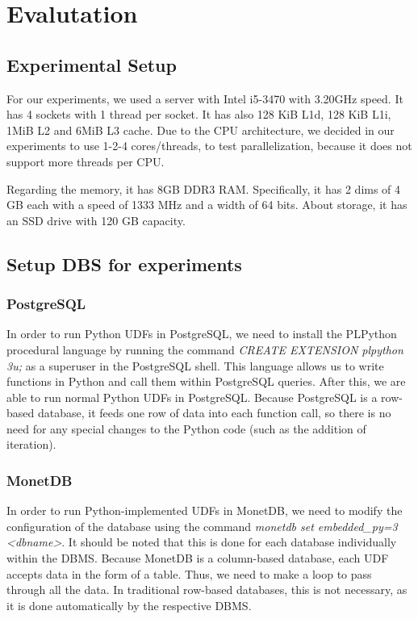 \section{Evalutation}
\label{sec:experiments}

\subsection{Experimental Setup}
\label{subsec:systemspecs}
For our experiments, we used a server with Intel i5-3470 with 3.20GHz speed. It has 4 sockets with 1 thread per socket. 
It has also 128 KiB L1d, 128 KiB L1i, 1MiB L2 and 6MiB L3 cache. Due to the CPU architecture, 
we decided in our experiments to use 1-2-4 cores/threads, 
to test parallelization, because it does not support more threads per CPU.

Regarding the memory, it has 8GB DDR3 RAM. Specifically, it has 2 dims of 4 GB each with a speed of 1333 MHz and a width of 64 bits. 
About storage, it has an SSD drive with 120 GB capacity.

\subsection{Setup DBS for experiments}
\subsubsection{PostgreSQL}
In order to run Python UDFs in PostgreSQL, we need to install the PL\/Python 
procedural language by running the command \emph{CREATE EXTENSION plpython
3u;} as a superuser in the PostgreSQL shell. 
This language allows us to write functions in Python and call them within
PostgreSQL queries. After this, we are able to run normal Python UDFs in
PostgreSQL. 
Because PostgreSQL is a row-based database, it feeds one row of data into 
each function call, so there is no need for any special changes to the 
Python code (such as the addition of iteration).

\subsubsection{MonetDB}
In order to run Python-implemented UDFs in MonetDB, we need to modify the 
configuration of the database using the command 
\emph{monetdb set embedded\_py=3 <dbname>}. 
It should be noted that this is done for each database individually within
the DBMS. Because MonetDB is a column-based database, each UDF accepts data
in the form of a table. 
Thus, we need to make a loop to pass through all the data. In traditional
row-based databases, this is not necessary, as it is done automatically by the respective DBMS.


